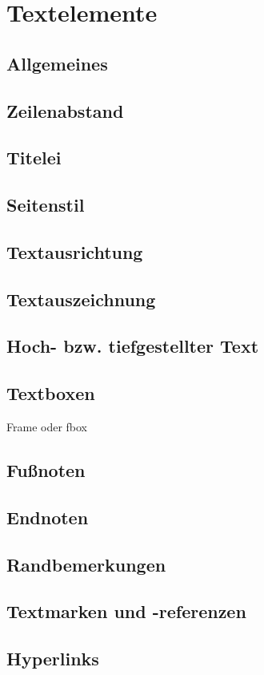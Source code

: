 \chapter{Textelemente}
\label{cha:textelemente}
\section{Allgemeines}
\section{Zeilenabstand}
\section{Titelei}
\section{Seitenstil}
\section{Textausrichtung}
\section{Textauszeichnung}
\section{Hoch- bzw. tiefgestellter Text}
\section{Textboxen}
Frame oder fbox
\section{Fußnoten}
\section{Endnoten}
\section{Randbemerkungen}
\section{Textmarken und -referenzen}
\section{Hyperlinks}
